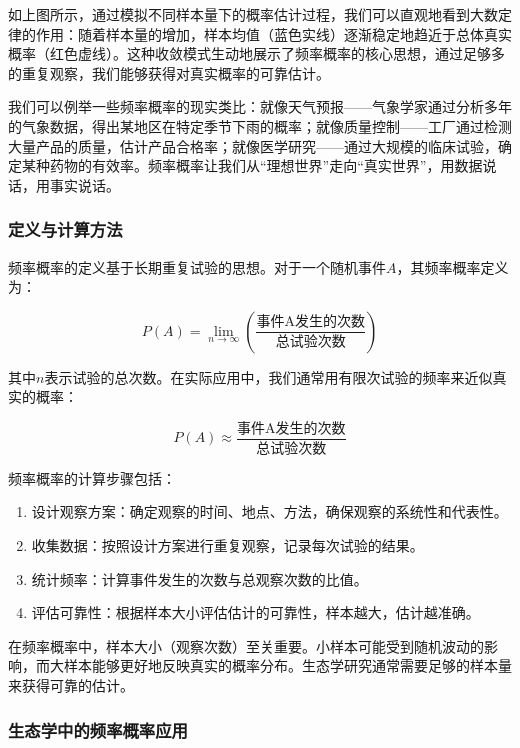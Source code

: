 \documentclass[
  twoside,12pt,fontset=none]{ctexbook}
\begin{document}
如上图所示，通过模拟不同样本量下的概率估计过程，我们可以直观地看到大数定律的作用：随着样本量的增加，样本均值（蓝色实线）逐渐稳定地趋近于总体真实概率（红色虚线）。这种收敛模式生动地展示了频率概率的核心思想，通过足够多的重复观察，我们能够获得对真实概率的可靠估计。

我们可以例举一些频率概率的现实类比：就像天气预报------气象学家通过分析多年的气象数据，得出某地区在特定季节下雨的概率；就像质量控制------工厂通过检测大量产品的质量，估计产品合格率；就像医学研究------通过大规模的临床试验，确定某种药物的有效率。频率概率让我们从``理想世界''走向``真实世界''，用数据说话，用事实说话。

\hypertarget{ux5b9aux4e49ux4e0eux8ba1ux7b97ux65b9ux6cd5}{%
\subsubsection{定义与计算方法}\label{ux5b9aux4e49ux4e0eux8ba1ux7b97ux65b9ux6cd5}}

频率概率的定义基于长期重复试验的思想。对于一个随机事件\(A\)，其频率概率定义为：

\[P(A) = \lim_{n \to \infty} \left( \frac{\text{事件A发生的次数}}{\text{总试验次数}} \right)\]

其中\(n\)表示试验的总次数。在实际应用中，我们通常用有限次试验的频率来近似真实的概率：

\[P(A) \approx \frac{\text{事件A发生的次数}}{\text{总试验次数}}\]

频率概率的计算步骤包括：

\begin{enumerate}
\def\labelenumi{\arabic{enumi}.}
\item
  设计观察方案：确定观察的时间、地点、方法，确保观察的系统性和代表性。
\item
  收集数据：按照设计方案进行重复观察，记录每次试验的结果。
\item
  统计频率：计算事件发生的次数与总观察次数的比值。
\item
  评估可靠性：根据样本大小评估估计的可靠性，样本越大，估计越准确。
\end{enumerate}

在频率概率中，样本大小（观察次数）至关重要。小样本可能受到随机波动的影响，而大样本能够更好地反映真实的概率分布。生态学研究通常需要足够的样本量来获得可靠的估计。

\hypertarget{ux751fux6001ux5b66ux4e2dux7684ux9891ux7387ux6982ux7387ux5e94ux7528}{%
\subsubsection{生态学中的频率概率应用}\label{ux751fux6001ux5b66ux4e2dux7684ux9891ux7387ux6982ux7387ux5e94ux7528}}
\end{document}
